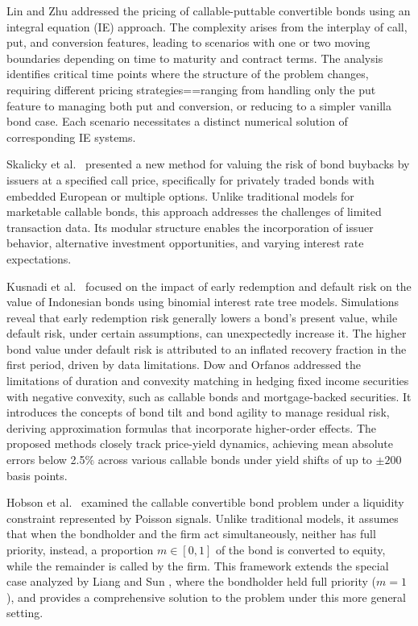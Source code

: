 \documentclass[10pt,a4paper]{amsart}
\numberwithin{equation}{section}
\begin{document}
Lin and Zhu \cite{lin2022pricing} addressed the pricing of callable-puttable 
convertible bonds using an integral equation (IE) approach. The complexity arises 
from the interplay of call, put, and conversion features, leading to scenarios with 
one or two moving boundaries depending on time to maturity and contract terms. 
The analysis identifies critical time points where the structure of the problem changes, 
requiring different pricing strategies==ranging from handling only the put feature 
to managing both put and conversion, or reducing to a simpler vanilla bond case. 
Each scenario necessitates a distinct numerical solution of corresponding IE systems.

Skalicky et al.\ \cite{skalicky2022valuation} presented a new method for valuing the 
risk of bond buybacks by issuers at a specified call price, specifically for privately 
traded bonds with embedded European or multiple options. Unlike traditional models 
for marketable callable bonds, this approach addresses the challenges of limited 
transaction data. Its modular structure enables the incorporation of issuer behavior, 
alternative investment opportunities, and varying interest rate expectations.

 Kusnadi et al.\ \cite{kusnadi2023callable} focused on the impact of early redemption
and default risk on the value of Indonesian bonds using binomial interest rate tree 
models. Simulations reveal that early redemption risk generally lowers a bond's present
value, while default risk, under certain assumptions, can unexpectedly increase it. 
The higher bond value under default risk is attributed to an inflated recovery 
fraction in the first period, driven by data limitations.
Dow and Orfanos \cite{dow2025interest} addressed the limitations of duration and 
convexity matching in hedging fixed income securities with negative convexity, 
such as callable bonds and mortgage-backed securities. It introduces the concepts of 
bond tilt and bond agility to manage residual risk, deriving approximation formulas 
that incorporate higher-order effects. The proposed methods closely track price-yield 
dynamics, achieving mean absolute errors below 2.5$\%$ across various callable bonds 
under yield shifts of up to $\pm 200$ basis points.


 Hobson et al.\ \cite{hobson2024callable} examined the callable convertible bond 
problem under a liquidity constraint represented by Poisson signals. Unlike traditional 
models, it assumes that when the bondholder and the firm act simultaneously, neither 
has full priority, instead, a proportion $ m \in [0, 1] $ of the bond is converted to 
equity, while the remainder is called by the firm. This framework extends the special 
case analyzed by Liang and Sun \cite{liang2019dynkin}, where the bondholder held full 
priority ($ m = 1 $), and provides a comprehensive solution to the problem under 
this more general setting.
\end{document}
